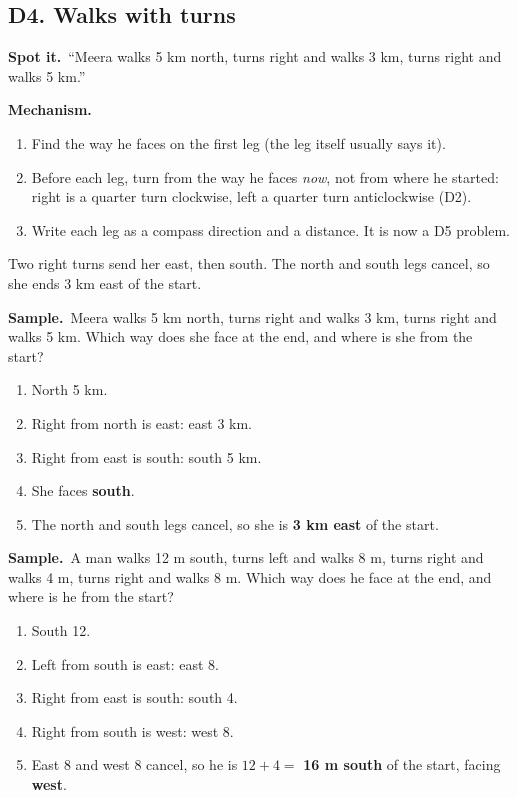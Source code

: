 \documentclass[11pt,a4paper]{article}
\let\oldsubsection\subsection
\renewcommand{\subsection}{\needspace{9\baselineskip}\oldsubsection}
\newcommand{\spot}{\textbf{\color{ember}Spot it.}\ }
\newcommand{\mech}{\textbf{\color{ember}Mechanism.}\ }
\newif\ifkeepsamp
\newcommand{\samp}{\ifkeepsamp\needspace{4\baselineskip}\fi\textbf{\color{ember}Sample.}\ }
\begin{document}
\subsection{D4. Walks with turns}
\spot ``Meera walks 5 km north, turns right and walks 3 km, turns right and walks 5 km.''

\mech
\begin{enumerate}
\item Find the way he faces on the first leg (the leg itself usually says it).
\item Before each leg, turn from the way he faces \emph{now}, not from where he started: right is a quarter turn clockwise, left a quarter turn anticlockwise (D2).
\item Write each leg as a compass direction and a distance. It is now a D5 problem.
\end{enumerate}

\begin{center}
\par\nopagebreak\smallskip
{\small Two right turns send her east, then south. The north and south legs cancel, so she ends 3 km east of the start.}
\end{center}

\samp Meera walks 5 km north, turns right and walks 3 km, turns right and walks 5 km. Which way does she face at the end, and where is she from the start?
\begin{enumerate}
\item North 5 km.
\item Right from north is east: east 3 km.
\item Right from east is south: south 5 km.
\item She faces \textbf{south}.
\item The north and south legs cancel, so she is \textbf{3 km east} of the start.
\end{enumerate}
\samp A man walks 12 m south, turns left and walks 8 m, turns right and walks 4 m, turns right and walks 8 m. Which way does he face at the end, and where is he from the start?
\begin{enumerate}
\item South 12.
\item Left from south is east: east 8.
\item Right from east is south: south 4.
\item Right from south is west: west 8.
\item East 8 and west 8 cancel, so he is $12 + 4 =$ \textbf{16 m south} of the start, facing \textbf{west}.
\end{enumerate}
\end{document}

